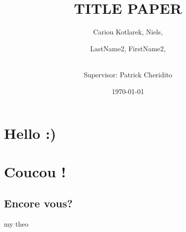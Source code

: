 \documentclass[10pt]{amsart}
\title{TITLE PAPER}
\author{
    Cariou Kotlarek, Niels,\\
    \and
    LastName2, FirstName2,\\
    \and
    \\ Supervisor: Patrick Cheridito
}
\date{\today}
\begin{document}
    \maketitle
    \begin{abstract}
    \end{abstract}



    \section{Hello :)}


    \section{Coucou !}

    \subsection{Encore vous?}

    \lipsum


    \begin{definition}[my def]
        \lipsum
    \end{definition}


    \begin{theoreme}[label = thrm:X]{my theo}
        \lipsum
    \end{theoreme}

    \begin{demo}{}{}
        \lipsum
    \end{demo}

    \begin{ajoutationV}{}{}
        \lipsum
    \end{ajoutationV}


    \printbibliography[category=cited]%
    \printbibliography[title={Further Reading},notcategory=cited]
    \nocite{*}
\end{document}
